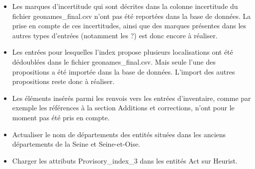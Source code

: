 \documentclass[a4paper,12pt,twoside]{book}
\begin{document}
\begin{itemize}
		\item Les marques d'incertitude qui sont décrites dans la colonne \og incertitude\fg{} du fichier geonames\_final.csv n'ont pas été reportées dans la base de données. La prise en compte de ces incertitudes, ainsi que des marques présentes dans les autres types d'entrées (notamment les \og ?\fg{}) est donc encore à réaliser.
		
		\item Les entrées pour lesquelles l'index propose plusieurs localisations ont été dédoublées dans le fichier geonames\_final.csv. Mais seule l'une des propositions a été importée dans la base de données. L'import des autres propositions reste donc à réaliser.
		
		\item Les éléments insérés parmi les renvois vers les entrées d'inventaire, comme par exemple les références à la section \og Additions et corrections\fg{}, n'ont pour le moment pas été pris en compte.
		
		\item Actualiser le nom de départements des entités situées dans les anciens départements de la Seine et Seine-et-Oise.
		
		\item Charger les attributs \og Provisory\_index\_3\fg{} dans les entités Act sur Heurist.
		
	\end{itemize}
	
	\backmatter
	\listoffigures
	\tableofcontents
	
\end{document}
